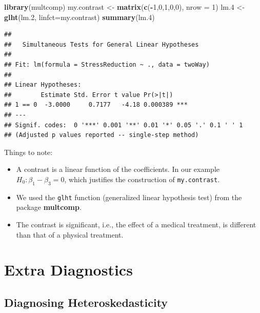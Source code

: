 \documentclass[]{book}
\newenvironment{Shaded}{\begin{snugshade}}{\end{snugshade}}
\newcommand{\DataTypeTok}[1]{\textcolor[rgb]{0.13,0.29,0.53}{#1}}
\newcommand{\DecValTok}[1]{\textcolor[rgb]{0.00,0.00,0.81}{#1}}
\newcommand{\FloatTok}[1]{\textcolor[rgb]{0.00,0.00,0.81}{#1}}
\newcommand{\KeywordTok}[1]{\textcolor[rgb]{0.13,0.29,0.53}{\textbf{#1}}}
\newcommand{\NormalTok}[1]{#1}
\newcommand{\OperatorTok}[1]{\textcolor[rgb]{0.81,0.36,0.00}{\textbf{#1}}}
\newcommand{\StringTok}[1]{\textcolor[rgb]{0.31,0.60,0.02}{#1}}
\providecommand{\tightlist}{%
  \setlength{\itemsep}{0pt}\setlength{\parskip}{0pt}}
\theoremstyle{definition}
\theoremstyle{definition}
\theoremstyle{definition}
\theoremstyle{remark}
\begin{document}
\begin{Shaded}
\begin{Highlighting}[]
\KeywordTok{library}\NormalTok{(multcomp)}
\NormalTok{my.contrast <-}\StringTok{ }\KeywordTok{matrix}\NormalTok{(}\KeywordTok{c}\NormalTok{(}\OperatorTok{-}\DecValTok{1}\NormalTok{,}\DecValTok{0}\NormalTok{,}\DecValTok{1}\NormalTok{,}\DecValTok{0}\NormalTok{,}\DecValTok{0}\NormalTok{), }\DataTypeTok{nrow =}  \DecValTok{1}\NormalTok{)}
\NormalTok{lm}\FloatTok{.4}\NormalTok{ <-}\StringTok{ }\KeywordTok{glht}\NormalTok{(lm}\FloatTok{.2}\NormalTok{, }\DataTypeTok{linfct=}\NormalTok{my.contrast)}
\KeywordTok{summary}\NormalTok{(lm}\FloatTok{.4}\NormalTok{)}
\end{Highlighting}
\end{Shaded}

\begin{verbatim}
## 
##   Simultaneous Tests for General Linear Hypotheses
## 
## Fit: lm(formula = StressReduction ~ ., data = twoWay)
## 
## Linear Hypotheses:
##        Estimate Std. Error t value Pr(>|t|)    
## 1 == 0  -3.0000     0.7177   -4.18 0.000389 ***
## ---
## Signif. codes:  0 '***' 0.001 '**' 0.01 '*' 0.05 '.' 0.1 ' ' 1
## (Adjusted p values reported -- single-step method)
\end{verbatim}

Things to note:

\begin{itemize}
\tightlist
\item
  A contrast is a linear function of the coefficients. In our example \(H_0:\beta_1-\beta_3=0\), which justifies the construction of \texttt{my.contrast}.
\item
  We used the \texttt{glht} function (generalized linear hypothesis test) from the package \textbf{multcomp}.
\item
  The contrast is significant, i.e., the effect of a medical treatment, is different than that of a physical treatment.
\end{itemize}

\hypertarget{extra-diagnostics}{%
\section{Extra Diagnostics}\label{extra-diagnostics}}

\hypertarget{diagnosing-heteroskedasticity}{%
\subsection{Diagnosing Heteroskedasticity}\label{diagnosing-heteroskedasticity}}
\end{document}
